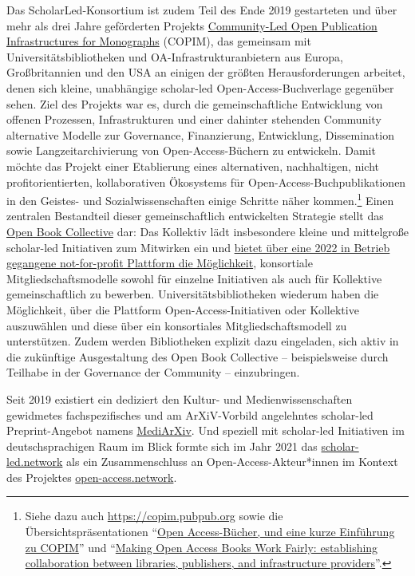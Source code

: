 \documentclass[a4paper,
fontsize=11pt,
oneside,
numbers=noperiodatend,
parskip=half-,
bibliography=totoc,
final
]{scrartcl}
\begin{document}
Das ScholarLed-Konsortium ist zudem Teil des Ende 2019 gestarteten und
über mehr als drei Jahre geförderten Projekts
\href{https://www.copim.ac.uk/}{Community-Led Open Publication
Infrastructures for Monographs} (COPIM), das gemeinsam mit
Universitätsbibliotheken und OA-Infrastrukturanbietern aus Europa,
Großbritannien und den USA an einigen der größten Herausforderungen
arbeitet, denen sich kleine, unabhängige scholar-led
Open-Access-Buchverlage gegenüber sehen. Ziel des Projekts war es, durch
die gemeinschaftliche Entwicklung von offenen Prozessen, Infrastrukturen
und einer dahinter stehenden Community alternative Modelle zur
Governance, Finanzierung, Entwicklung, Dissemination sowie
Langzeitarchivierung von Open-Access-Büchern zu entwickeln. Damit möchte
das Projekt einer Etablierung eines alternativen, nachhaltigen, nicht
profitorientierten, kollaborativen Ökosystems für
Open-Access-Buchpublikationen in den Geistes- und Sozialwissenschaften
einige Schritte näher kommen.\footnote{Siehe dazu auch
  \url{https://copim.pubpub.org} sowie die Übersichtspräsentationen
  \enquote{\href{https://doi.org/10.5281/zenodo.6343819}{Open
  Access-Bücher, und eine kurze Einführung zu COPIM}} und
  \enquote{\href{https://copim.pubpub.org/pub/rluk22-making-open-access-books-work-fairly-establishing-collaboration-between-libraries-publishers-and-infrastructure-providers/release/1?readingCollection=6c638086}{Making
  Open Access Books Work Fairly: establishing collaboration between
  libraries, publishers, and infrastructure providers}}.} Einen
zentralen Bestandteil dieser gemeinschaftlich entwickelten Strategie
stellt das \href{https://copim.pubpub.org/open-book-collective}{Open
Book Collective} dar: Das Kollektiv lädt insbesondere kleine und
mittelgroße scholar-led Initiativen zum Mitwirken ein und
\href{https://openbookcollective.org}{bietet über eine 2022 in Betrieb
gegangene not-for-profit Plattform die Möglichkeit}, konsortiale
Mitgliedschaftsmodelle sowohl für einzelne Initiativen als auch für
Kollektive gemeinschaftlich zu bewerben. Universitätsbibliotheken
wiederum haben die Möglichkeit, über die Plattform
Open-Access-Initiativen oder Kollektive auszuwählen und diese über ein
konsortiales Mitgliedschaftsmodell zu unterstützen. Zudem werden
Bibliotheken explizit dazu eingeladen, sich aktiv in die zukünftige
Ausgestaltung des Open Book Collective -- beispielsweise durch Teilhabe
in der Governance der Community -- einzubringen.

Seit 2019 existiert ein dediziert den Kultur- und Medienwissenschaften
gewidmetes fachspezifisches und am ArXiV-Vorbild angelehntes scholar-led
Preprint-Angebot namens \href{https://mediarxiv.com/}{MediArXiv}. Und
speziell mit scholar-led Initiativen im deutschsprachigen Raum im Blick
formte sich im Jahr 2021 das
\href{https://open-access.network/vernetzen/digitale-fokusgruppen/fokusgruppe-scholar-led}{scholar-led.network}
als ein Zusammenschluss an Open-Access-Akteur*innen im Kontext des
Projektes \href{https://open-access.network/}{open-access.network}.
\end{document}
